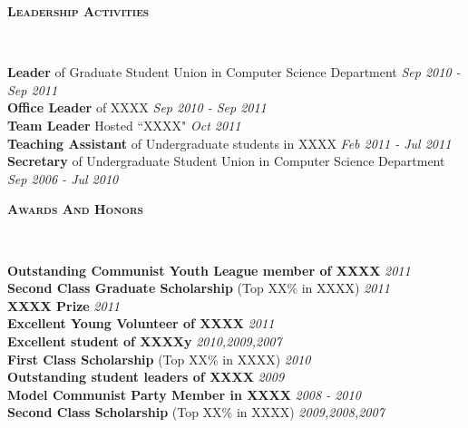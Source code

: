 \documentclass[paper=a4]{article}
\newenvironment{changemargin}[2]{%
  \begin{list}{}{%
    \setlength{\topsep}{0pt}%
    \setlength{\leftmargin}{#1}%
    \setlength{\rightmargin}{#2}%
    \setlength{\listparindent}{\parindent}%
    \setlength{\itemindent}{\parindent}%
    \setlength{\parsep}{\parskip}%
  }%
  \item[]}{\end{list}
}
\newcommand{\lineover}{
	\begin{changemargin}{-0.05in}{-0.05in}
		\vspace*{-8pt}
		\hrulefill \\
		\vspace*{-2pt}
	\end{changemargin}
}
\newcommand{\header}[1]{
	\begin{changemargin}{-0.5in}{-0.5in}
		\bfseries{\scshape{#1}}\\
  	\lineover
	\end{changemargin}
}
\newenvironment{body} {
	\vspace*{-16pt}
	\begin{changemargin}{-0.5in}{-0.5in}
  }	
	{\end{changemargin}
}
\begin{document}
\smallskip


\header{\large{Leadership Activities}}

\begin{body}
	\vspace{14pt}
	\textbf{Leader} of Graduate Student Union in Computer Science Department  \hfill {} \emph{Sep 2010 - Sep 2011}\\
	\smallskip
	\textbf{Office Leader} of XXXX  \hfill {} \emph{Sep 2010 - Sep 2011}\\
	\smallskip
	\textbf{Team Leader} Hosted ``XXXX" \hfill {} \emph{Oct 2011}\\
	\smallskip
	\textbf{Teaching Assistant} of Undergraduate students in XXXX \hfill{} \emph{Feb 2011 - Jul 2011}\\
	\textbf{Secretary} of Undergraduate Student Union  in Computer Science Department \hfill {} \emph{Sep 2006 - Jul 2010}\\
	\smallskip
\end{body}
\smallskip


\header{\large{Awards And Honors}}

\begin{body}
	\vspace{14pt}
	\textbf{Outstanding Communist Youth League member of XXXX} \hfill{} \emph{2011}\\
	\smallskip
	\textbf{Second Class Graduate Scholarship} (Top XX\% in XXXX) \hfill{} \emph{2011}\\
	\smallskip
	\textbf{XXXX Prize} \hfill{} \emph{2011}\\
	\smallskip
	\textbf{Excellent Young Volunteer of XXXX} \hfill{} \emph{2011}\\
	\smallskip
	\textbf{Excellent student of XXXXy} \hfill{} \emph{2010,2009,2007}\\
	\smallskip
	\textbf{First Class Scholarship} (Top XX\% in XXXX) \hfill{} \emph{2010}\\
	\smallskip
	\textbf{Outstanding student leaders of XXXX} \hfill{} \emph{2009}\\
	\smallskip
	\textbf{Model Communist Party Member in XXXX} \hfill{} \emph{2008 - 2010}\\
	\smallskip
	\textbf{Second Class Scholarship} (Top XX\% in XXXX) \hfill{} \emph{2009,2008,2007}\\
	\smallskip
\end{body}
\end{document}
